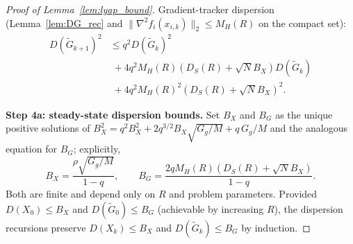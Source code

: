 \documentclass[review,onefignum,onetabnum]{siamart171218}
\begin{document}
\begin{proof}[Proof of Lemma~\ref{lem:lyap_bound}]
Gradient-tracker dispersion (Lemma~\ref{lem:DG_rec}
and $\|\nabla^2 f_i(x_{i,k})\|_2\le M_H(R)$ on the compact set):
\begin{align*}
  D(\tilde G_{k+1})^2
  &\le q^2 D(\tilde G_k)^2\\
  &\;+ 4q^2 M_H(R)(D_S(R){+}\sqrt{N}B_X)D(\tilde G_k)\\
  &\;+ 4q^2 M_H(R)^2(D_S(R){+}\sqrt{N}B_X)^2.
\end{align*}

\noindent\textbf{Step 4a: steady-state dispersion bounds.}
Set $B_X$ and $B_G$ as the unique positive solutions of
$B_X^2 = q^2 B_X^2 + 2q^{3/2}B_X\sqrt{G_g/M}+q\,G_g/M$
and the analogous equation for $B_G$; explicitly,
\begin{equation}\label{eq:disp_fp}
  B_X
  = \frac{\rho\sqrt{G_g/M}}{1-q},
  \qquad
  B_G
  = \frac{2qM_H(R)(D_S(R)+\sqrt{N}B_X)}{1-q}.
\end{equation}
Both are finite and depend only on $R$ and problem parameters.
Provided $D(X_0)\le B_X$ and $D(\tilde G_0)\le B_G$
(achievable by increasing $R$), the dispersion recursions
preserve $D(X_k)\le B_X$ and $D(\tilde G_k)\le B_G$ by induction.


\end{proof}
\end{document}

